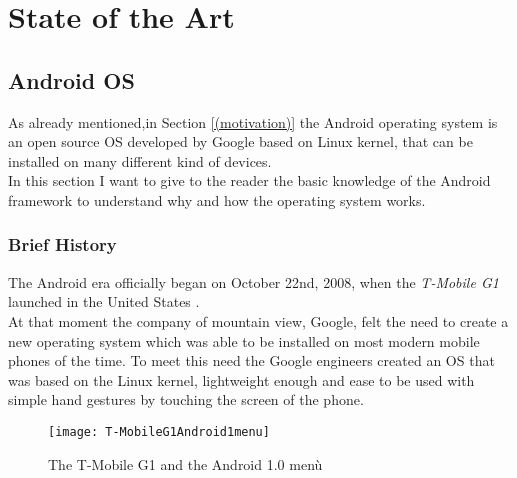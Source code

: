 %
%
\chapter{State of the Art}
%
\label{cap:statoarte}
%
%
\section{Android OS} \label{androidos}
\par As already mentioned,in Section \ref{(motivation)} the Android operating system is an open source OS developed by Google based on Linux kernel, that can be installed on many different kind of devices.\\
In this section I want to give to the reader the basic knowledge of the Android framework to understand why and how the operating system works.
\subsection{Brief History} \label{briefhist}
\par
The Android era officially began on October 22nd, 2008, when the \textit{T-Mobile G1} launched in the United States \cite{verge2011android}.\\
At that moment the company of mountain view, Google, felt the need to create a new operating system which was able to be installed on most modern mobile phones of the time. To meet this need the Google engineers created an OS that was based on the Linux kernel, lightweight enough and ease to be used with simple hand gestures by touching the screen of the phone.\\

\begin{figure}[h]
	\centering
	\texttt{[image: T-MobileG1Android1menu]}
	\caption{The T-Mobile G1 and the Android 1.0 menù}
	\label{2.1:The T-Mobile G1 and the Android 1.0 menù}
\end{figure}

